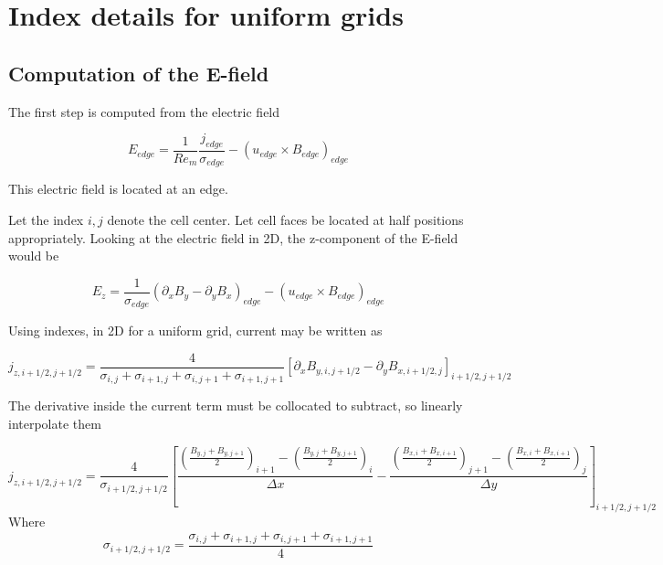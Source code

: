 \documentclass[11pt]{article}
\begin{document}
\section{Index details for uniform grids}

\subsection{Computation of the E-field}
The first step is computed from the electric field

\begin{equation}
	E_{edge} = \frac{1}{Re_m} \frac{j_{edge}}{\sigma_{edge}} -
	(u_{edge} \times B_{edge})_{edge}
\end{equation}

This electric field is located at an edge.

Let the index $i,j$ denote the cell center. Let cell faces be located at half positions appropriately. Looking at the electric field in 2D, the z-component of the E-field would be

\begin{equation}
	E_z = \frac{1}{\sigma_{edge}}
	(\partial_x B_y - \partial_y B_x)_{edge} -
	(u_{edge} \times B_{edge})_{edge}
\end{equation}

Using indexes, in 2D for a uniform grid, current may be written as

\begin{equation}
	j_{z,i+1/2,j+1/2} =
	\frac{4}{\sigma_{i,j} + \sigma_{i+1,j} + \sigma_{i,j+1} + \sigma_{i+1,j+1}}
	\left[
	\partial_x B_{y,i,j+1/2} - \partial_y B_{x,i+1/2,j}
	\right]_{i+1/2,j+1/2}
\end{equation}

The derivative inside the current term must be collocated to subtract, so linearly interpolate them

\begin{equation}
	j_{z,i+1/2,j+1/2} =
	\frac{4}{\sigma_{i+1/2,j+1/2}}
	\left[
	\frac{
	\left(\frac{B_{y,j}+B_{y,j+1}}{2}\right)_{i+1}-\left(\frac{B_{y,j}+B_{y,j+1}}{2}\right)_{i}
	 }{\Delta x}
	-
	\frac{
	\left(\frac{B_{x,i}+B_{x,i+1}}{2}\right)_{j+1}-\left(\frac{B_{x,i}+B_{x,i+1}}{2}\right)_{j}
	}{\Delta y}
	\right]_{i+1/2,j+1/2}
\end{equation}
Where
\begin{equation}
	\sigma_{i+1/2,j+1/2} =
	\frac{\sigma_{i,j} + \sigma_{i+1,j} + \sigma_{i,j+1} + \sigma_{i+1,j+1}}{4}
\end{equation}
\end{document}
